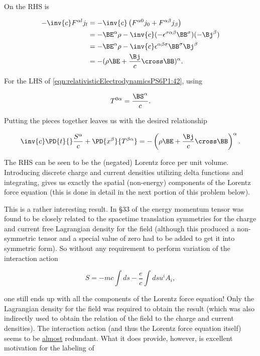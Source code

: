 On the RHS is 

\begin{align*}
-\inv{c} F^{\alpha l} j_l
&=
-\inv{c} 
\left( 
F^{\alpha 0} j_0 
+F^{\alpha \beta} j_\beta 
\right) \\
&= 
- \BE^\alpha \rho - \inv{c} (- \epsilon^{\sigma \alpha \beta} \BB^\sigma) (-\Bj^\beta) \\
&= 
- \BE^\alpha \rho - \inv{c} \epsilon^{\alpha \beta \sigma} \BB^\sigma \Bj^\beta \\
&= 
- (\rho \BE + \frac{\Bj}{c} \cross \BB)^\alpha.
\end{align*}

For the LHS of \ref{eqn:relativisticElectrodynamicsPS6P1:42}, using

\begin{equation}\label{eqn:relativisticElectrodynamicsPS6P1:200}
T^{0 \alpha} = \frac{\BS^\alpha}{c}.
\end{equation}

Putting the pieces together leaves us with the desired relationship

\begin{equation}\label{eqn:relativisticElectrodynamicsPS6P1:201}
\inv{c} \PD{t}{} \frac{S^\alpha}{c} + \PD{x^\beta}{T^{\beta \alpha}} = 
- \left( \rho \BE + \frac{\Bj}{c} \cross \BB \right)^\alpha.
\end{equation}

The RHS can be seen to be the (negated) Lorentz force per unit volume.  Introducing discrete charge and current densities utilizing delta functions and integrating, gives us exactly the spatial (non-energy) components of the Lorentz force equation (this is done in detail in the next portion of this problem below).

This is a rather interesting result.  In \S 33 of \cite{landau1980classical} the energy momentum tensor was found to be closely related to the spacetime translation symmetries for the charge and current free Lagrangian density for the field (although this produced a non-symmetric tensor and a special value of zero had to be added to get it into symmetric form).  So without any requirement to perform variation of the interaction action

\begin{equation}\label{eqn:relativisticElectrodynamicsPS6P1:202}
S = -m c \int ds - \frac{e}{c} \int ds u^i A_i,
\end{equation}

one still ends up with all the components of the Lorentz force equation!  Only the Lagrangian density for the field was required to obtain the result (which was also indirectly used to obtain the relation of the field to the charge and current densities).  The interaction action (and thus the Lorentz force equation itself) seems to be \underline{almost} redundant.  What it does provide, however, is excellent motivation for the labeling of

